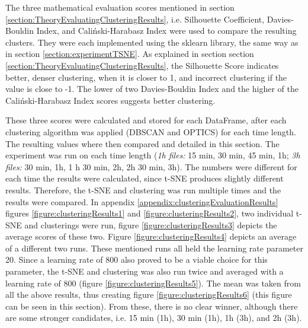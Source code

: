 
The three mathematical evaluation scores mentioned in section \ref{section:TheoryEvaluatingClusteringResults}, i.e. Silhouette Coefficient, Davies-Bouldin Index, and Caliński-Harabasz Index were used to compare the resulting clusters.  They were each implemented using the sklearn library, the same way as in section \ref{section:experimentTSNE}.
As explained in section  section \ref{section:TheoryEvaluatingClusteringResults}, the Silhouette Score indicates better, denser clustering, when it is closer to 1, and incorrect clustering if the value is close to -1. The lower of two Davies-Bouldin Index and the higher of the Caliński-Harabasz Index scores suggests better clustering.


These three scores were calculated and stored for each DataFrame, after each clustering algorithm was applied (DBSCAN and OPTICS) for each time length. The resulting values where then compared and detailed in this section.
The experiment was run on each time length (\textit{1h files:} 15 min, 30 min, 45 min, 1h; \textit{3h files:} 30 min, 1h, 1 h 30 min, 2h, 2h 30 min, 3h).
The numbers were different for each time the results were calculated, since t-SNE produces slightly different results. Therefore, the t-SNE and clustering was run multiple times and the results were compared. In appendix \ref{appendix:clusteringEvaluationResults} figures \ref{figure:clusteringResults1} and \ref{figure:clusteringResults2}, two individual t-SNE and clusterings were run, figure \ref{figure:clusteringResults3} depicts the average scores of these two. Figure \ref{figure:clusteringResults4} depicts an average of a different two runs. These mentioned runs all held the learning rate parameter 20. Since a learning rate of 800 also proved to be a viable choice for this parameter, the t-SNE and clustering was also run twice and averaged with a learning rate of 800 (figure \ref{figure:clusteringResults5}). The mean was taken from all the above results, thus creating figure \ref{figure:clusteringResults6} (this figure can be seen in this section). From these, there is no clear winner, although there are some stronger candidates, i.e. 15 min (1h), 30 min (1h), 1h (3h), and 2h (3h). 

